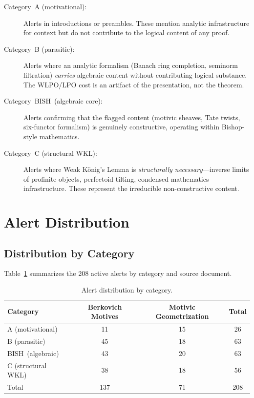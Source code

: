 \documentclass[11pt]{article}
\newcommand{\BISH}{\textsf{BISH}}
\newcommand{\WKL}{\textsf{WKL}}
\begin{document}
\begin{description}
\item[Category~A (motivational):] Alerts in introductions or preambles.
  These mention analytic infrastructure for context but do not contribute
  to the logical content of any proof.

\item[Category~B (parasitic):] Alerts where an analytic formalism
  (Banach ring completion, seminorm filtration) \emph{carries} algebraic
  content without contributing logical substance.  The WLPO/LPO cost is
  an artifact of the presentation, not the theorem.

\item[Category~\BISH\ (algebraic core):] Alerts confirming that the
  flagged content (motivic sheaves, Tate twists, six-functor formalism)
  is genuinely constructive, operating within Bishop-style mathematics.

\item[Category~C (structural WKL):] Alerts where Weak K\"onig's Lemma
  is \emph{structurally necessary}---inverse limits of profinite objects,
  perfectoid tilting, condensed mathematics infrastructure.
  These represent the irreducible non-constructive content.
\end{description}

\section{Alert Distribution}
\label{sec:distribution}

\subsection{Distribution by Category}

Table~\ref{tab:category} summarizes the 208 active alerts by category
and source document.

\begin{table}[ht]
\centering
\caption{Alert distribution by category.}
\label{tab:category}
\begin{tabular}{@{}lccc@{}}
\toprule
Category & Berkovich Motives & Motivic Geometrization & Total \\
\midrule
A (motivational)    & 11  & 15  & 26  \\
B (parasitic)       & 45  & 18  & 63  \\
\BISH\ (algebraic)  & 43  & 20  & 63  \\
C (structural \WKL) & 38  & 18  & 56  \\
\midrule
Total               & 137 & 71  & 208 \\
\bottomrule
\end{tabular}
\end{table}
\end{document}

